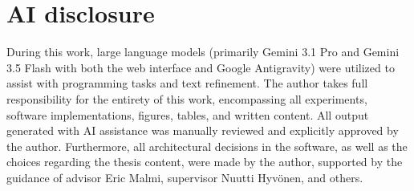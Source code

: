 \section*{AI disclosure}

During this work, large language models (primarily Gemini 3.1 Pro and Gemini 3.5 Flash with both the web interface and Google Antigravity) were utilized to assist with programming tasks and text refinement. The author takes full responsibility for the entirety of this work, encompassing all experiments, software implementations, figures, tables, and written content. All output generated with AI assistance was manually reviewed and explicitly approved by the author. Furthermore, all architectural decisions in the software, as well as the choices regarding the thesis content, were made by the author, supported by the guidance of advisor Eric Malmi, supervisor Nuutti Hyvönen, and others.

